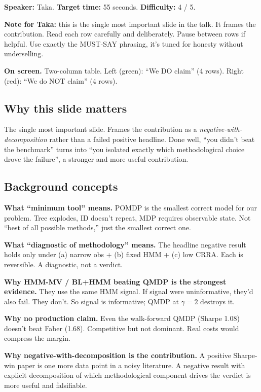 \documentclass[11pt]{article}
\begin{document}
\textbf{Speaker:} Taka. \quad\textbf{Target time:} 55 seconds. \quad\textbf{Difficulty:} 4 / 5.

\textbf{Note for Taka:} this is the single most important slide in the talk. It frames the contribution. Read each row carefully and deliberately. Pause between rows if helpful. Use exactly the MUST-SAY phrasing, it's tuned for honesty without underselling.

\textbf{On screen.} Two-column table. Left (green): ``We DO claim'' (4 rows). Right (red): ``We do NOT claim'' (4 rows).

\subsection*{Why this slide matters}

The single most important slide. Frames the contribution as a \emph{negative-with-decomposition} rather than a failed positive headline. Done well, ``you didn't beat the benchmark'' turns into ``you isolated exactly which methodological choice drove the failure'', a stronger and more useful contribution.

\subsection*{Background concepts}

\textbf{What ``minimum tool'' means.} POMDP is the smallest correct model for our problem. Tree explodes, ID doesn't repeat, MDP requires observable state. Not ``best of all possible methods,'' just the smallest correct one.

\textbf{What ``diagnostic of methodology'' means.} The headline negative result holds only under (a) narrow obs + (b) fixed HMM + (c) low CRRA. Each is reversible. A diagnostic, not a verdict.

\textbf{Why HMM-MV / BL+HMM beating QMDP is the strongest evidence.} They use the same HMM signal. If signal were uninformative, they'd also fail. They don't. So signal is informative; QMDP at $\gamma = 2$ destroys it.

\textbf{Why no production claim.} Even the walk-forward QMDP (Sharpe 1.08) doesn't beat Faber (1.68). Competitive but not dominant. Real costs would compress the margin.

\textbf{Why negative-with-decomposition is the contribution.} A positive Sharpe-win paper is one more data point in a noisy literature. A negative result with explicit decomposition of which methodological component drives the verdict is more useful and falsifiable.
\end{document}
